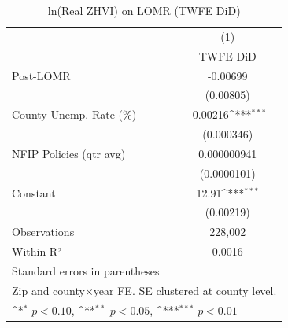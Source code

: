 \begin{table}[htbp]\centering
\def\sym#1{\ifmmode^{#1}\else\(^{#1}\)\fi}
\caption{ln(Real ZHVI) on LOMR (TWFE DiD)}
\label{tab:twfe}
\begin{tabular}{l*{1}{c}}
\hline\hline
                    &\multicolumn{1}{c}{(1)}\\
                    &\multicolumn{1}{c}{TWFE DiD}\\
\hline
Post-LOMR           &    -0.00699         \\
                    &   (0.00805)         \\
[0.3em]
County Unemp. Rate (\%)&    -0.00216\sym{***}\\
                    &  (0.000346)         \\
[0.3em]
NFIP Policies (qtr avg)& 0.000000941         \\
                    & (0.0000101)         \\
[0.3em]
Constant            &       12.91\sym{***}\\
                    &   (0.00219)         \\
\hline
Observations        &     228,002         \\
Within R²           &      0.0016         \\
\hline\hline
\multicolumn{2}{l}{\footnotesize Standard errors in parentheses}\\
\multicolumn{2}{l}{\footnotesize Zip and county×year FE. SE clustered at county level.}\\
\multicolumn{2}{l}{\footnotesize \sym{*} \(p<0.10\), \sym{**} \(p<0.05\), \sym{***} \(p<0.01\)}\\
\end{tabular}
\end{table}
